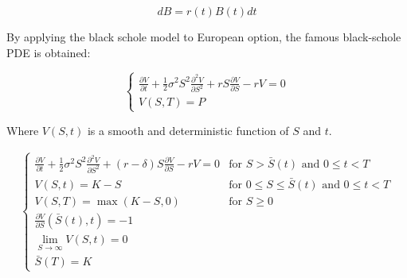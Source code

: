 \begin{equation}
  dB = r(t)B(t)dt
\end{equation}


By applying the black schole model to European option, the famous black-schole 
PDE is obtained:

\begin{equation}
  \begin{cases}
    \frac{\partial{V}}{\partial{t}} + \frac{1}{2}\sigma^{2} S^2 \frac{\partial^2{V}}{\partial{S^2}} + r S \frac{\partial{V}}{\partial{S}} - rV = 0 \\
    V(S, T) = P
  \end{cases}
\end{equation}

Where $V(S,t)$ is a smooth and deterministic function of $S$ and $t$.

\begin{align}
  \begin{cases}
    \frac{\partial{V}}{\partial{t}} + \frac{1}{2}\sigma^{2} S^2 \frac{\partial^2{V}}{\partial{S^2}} + (r - \delta) S \frac{\partial{V}}{\partial{S}} - rV = 0 & \text{for $S > \bar{S}(t)$ and $0 \le t < T$} \\
    V(S, t) = K - S & \text{for $0 \le S \le \bar{S}(t)$ and $0 \le t < T$} \\
    V(S, T) = \max(K - S, 0) & \text{for $S \ge 0$} \\
    \frac{\partial{V}}{\partial{S}}(\bar{S}(t), t) = -1 \\
    \lim_{S\rightarrow \infty} V(S, t) = 0 \\
    \bar{S}(T) = K
  \end{cases}
  \label{eq:background:finance:free_boundary_problem}
\end{align}